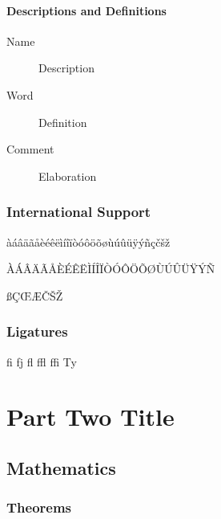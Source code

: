 \documentclass[
	11pt, %
	fleqn, %
	a4paper, %
]{LegrandOrangeBook}
\begin{document}
\subsection{Descriptions and Definitions}

\begin{description}
	\item[Name] Description
	\item[Word] Definition
	\item[Comment] Elaboration
\end{description}


\section{International Support}

àáâäãåèéêëìíîïòóôöõøùúûüÿýñçčšž

\noindent ÀÁÂÄÃÅÈÉÊËÌÍÎÏÒÓÔÖÕØÙÚÛÜŸÝÑ

\noindent ßÇŒÆČŠŽ


\section{Ligatures}

fi fj fl ffl ffi Ty


\part{Part Two Title}


\chapter{Mathematics}

\section{Theorems}
\end{document}

